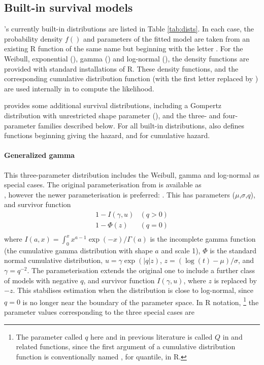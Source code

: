\documentclass[nojss,nofooter]{jss}
\begin{document}
\subsection{Built-in survival models}

's currently built-in distributions are listed in
Table \ref{tab:dists}.  In each case, the probability density $f()$
and parameters of the fitted model are taken from an existing R
function of the same name but beginning with the letter .  For
the Weibull, exponential (), gamma () and
log-normal (), the density functions are provided with
standard installations of R.  These density functions, and the
corresponding cumulative distribution function (with the first letter
 replaced by ) are used internally in
 to compute the likelihood.

 provides some additional survival distributions,
including a Gompertz distribution with unrestricted shape parameter
(), and the three- and four-parameter families
described below.  For all built-in distributions,  also
defines functions beginning  giving the hazard, and 
for cumulative hazard.

\paragraph{Generalized gamma} This three-parameter distribution
includes the Weibull, gamma and log-normal as special cases.  The
original parameterisation from \citet{stacy:gengamma} is available as\\
, however the newer parameterisation
\citep{prentice:loggamma} is preferred: .  This has
parameters ($\mu$,$\sigma$,$q$), and survivor function
\[
\begin{array}{ll}
1 - I(\gamma,u)   & (q > 0)\\
1 - \Phi(z)  & (q = 0)\\
\end{array}
\]
where $I(a,x) = \int_0^x x^{a-1}\exp(-x)/\Gamma(a)$ is the incomplete gamma function (the cumulative gamma distribution with shape $a$ and scale 1), $\Phi$ is the standard normal cumulative distribution,  $u = \gamma \exp(|q|z)$, $z=(\log(t) - \mu)/\sigma$, and $\gamma=q^{-2}$.   The \citet{prentice:loggamma} parameterisation extends the original one to include a further class of models with negative $q$, and survivor function $I(\gamma,u)$, where $z$ is replaced by $-z$.   This stabilises estimation when the distribution is close to log-normal, since $q=0$ is no longer near the boundary of the parameter space.    In R notation, \footnote{The parameter called $q$ here and in previous literature is called $Q$ in  and related functions, since the first argument of a cumulative distribution function is conventionally named , for quantile, in R.} the parameter values corresponding to the three special cases are
\end{document}
